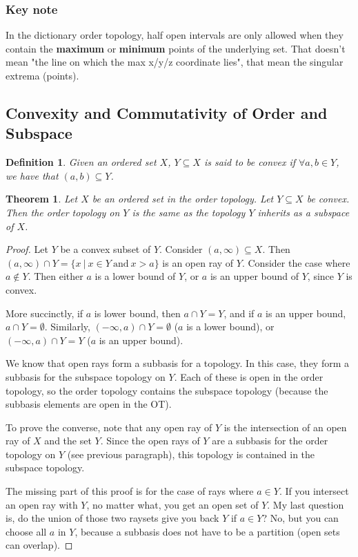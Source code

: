 \documentclass[11pt]{article}
\newtheorem{theorem}{Theorem}[section]
\newtheorem{definition}{Definition}[section]
\begin{document}
\subsubsection{Key note}
\label{sec:orgce008d2}
In the dictionary order topology, half open intervals are only allowed
when they contain the \textbf{maximum} or \textbf{minimum} points of the underlying
set. That doesn't mean "the line on which the max x/y/z coordinate
lies", that mean the singular extrema (points).

\subsection{Convexity and Commutativity of Order and Subspace}
\label{sec:org82303d8}

\begin{definition}


Given an ordered set \(X\), \(Y\subseteq X\) is said to be convex if
\(\forall a,b \in Y\), we have that \((a,b) \subseteq Y\).
\end{definition}

\begin{theorem}


Let \(X\) be an ordered set in the order topology. Let \(Y\subseteq X\) be
convex. Then the order topology on \(Y\) is the same as the topology \(Y\)
inherits as a subspace of \(X\).
\end{theorem}
\begin{proof}


Let \(Y\) be a convex subset of \(Y\). Consider \((a, \infty) \subseteq
X\). Then \((a,\infty)\cap Y = \{x\ |\ x \in Y\ \text{and}\ x > a\}\) is an
open ray of \(Y\). Consider the case where \(a \not\in Y\). Then either
\(a\) is a lower bound of \(Y\), or \(a\) is an upper bound of \(Y\), since
\(Y\) is convex.

More succinctly, if \(a\) is lower bound, then \(a\cap Y = Y\), and if \(a\)
is an upper bound, \(a\cap Y = \emptyset\). Similarly, \((-\infty, a)\cap
Y = \emptyset\) (\(a\) is a lower bound), or \((-\infty, a)\cap Y = Y\)
(\(a\) is an upper bound).

We know that open rays form a subbasis for a topology. In this case,
they form a subbasis for the subspace topology on \(Y\). Each of these
is open in the order topology, so the order topology contains the
subspace topology (because the subbasis elements are open in the OT).

To prove the converse, note that any open ray of \(Y\) is the
intersection of an open ray of \(X\) and the set \(Y\). Since the open
rays of \(Y\) are a subbasis for the order topology on \(Y\) (see previous
paragraph), this topology is contained in the subspace topology.

The missing part of this proof is for the case of rays where \(a \in
Y\). If you intersect an open ray with \(Y\), no matter what, you get an
open set of \(Y\). My last question is, do the union of those two
raysets give you back \(Y\) if \(a \in Y\)? No, but you can choose all \(a\)
in \(Y\), because a subbasis does not have to be a partition (open sets
can overlap).
\end{proof}
\end{document}
